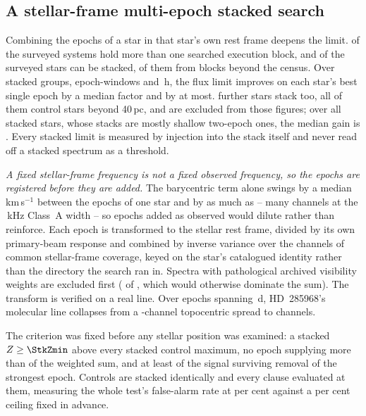 \subsection{A stellar-frame multi-epoch stacked search}
\label{sec:stack}

Combining the epochs of a star in that star's own rest frame deepens the
limit. \EpMulti{} of the \NSystems{} surveyed systems hold more than one
searched execution block, and \SxStkStarCensus{} of the surveyed stars can be
stacked, \SttNStkOneEb{} of them from blocks beyond the census. Over \SyStkNGroup{} stacked groups, \SyStkNEpochComb{} epoch-windows and
\SyStkHours\,h, the flux limit improves on each star's best single epoch by a
median factor \SyStkGainMed{} and by \SyStkGainMax{} at most.
\SxStkStarOutside{} further stars stack too, all of them control stars beyond
40\,pc, and are excluded from those figures; over all \StkNStar{} stacked
stars, whose stacks are mostly shallow two-epoch ones, the median gain is
\StkLimitGainMed. Every
stacked limit is measured by injection into the stack itself and never read
off a stacked spectrum as a threshold.

\emph{A fixed stellar-frame frequency is not a fixed observed frequency, so
the epochs are registered before they are added.} The barycentric term alone
swings by a median \StkVcorrSwingMed\,km\,s$^{-1}$ between the epochs of one
star and by as much as \StkVcorrSwingMax{} -- many channels at the
\StkRefChanKHz\,kHz Class~A width -- so epochs added as observed would dilute
rather than reinforce. Each epoch is transformed to the stellar rest frame,
divided by its own primary-beam response and combined by inverse variance
over the channels of common stellar-frame coverage, keyed on the star's
catalogued identity rather than the directory the search ran in. Spectra with
pathological archived visibility weights are excluded first
(\StkBadWeight{} of \StkNProd, which would otherwise dominate the sum). The transform is verified on a real line. Over \StkRegNEpoch{} epochs
spanning \StkRegSpanD\,d, HD~285968's molecular line collapses from a
\StkRegTopoChan-channel topocentric spread to \StkRegStellarChan{}
channels.

The criterion was fixed before any stellar position was examined: a stacked
$Z\ge\StkZmin$ above every stacked control maximum, no epoch supplying more
than \StkDomMax{} of the weighted sum, and at least \StkJkMin{} of the signal
surviving removal of the strongest epoch. Controls are stacked identically
and every clause evaluated at them, measuring the whole test's
false-alarm rate at \StkCtrlFap{} per cent against a \StkFapCeil{} per cent
ceiling fixed in advance.

